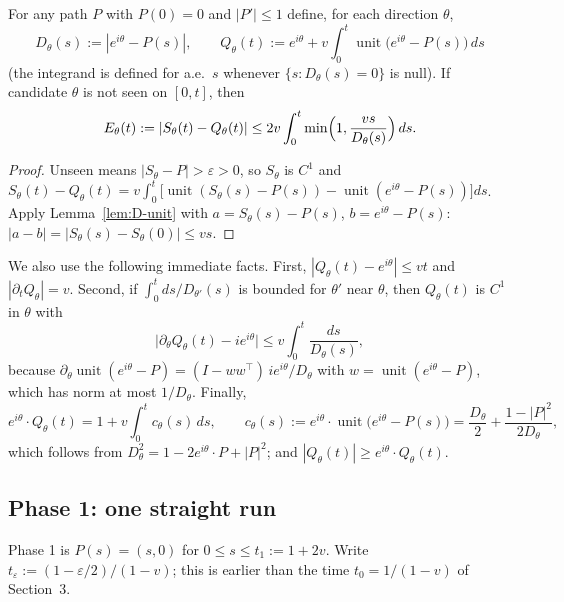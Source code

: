 \begin{lemma}\label{lem:D-pred}
For any path $P$ with $P(0)=0$ and $|P'|\le1$ define, for each direction $\theta$,
\begin{equation}\label{eq:D-Q}
D_\theta(s):=|e^{i\theta}-P(s)|,\qquad Q_\theta(t):=e^{i\theta}+v\int_0^t\operatorname{unit}\bigl(e^{i\theta}-P(s)\bigr)\,ds
\end{equation}
(the integrand is defined for a.e.\ $s$ whenever $\{s:D_\theta(s)=0\}$ is null). If candidate $\theta$ is not seen on $[0,t]$, then
\begin{equation}\label{eq:D-E}
E_\theta(t):=|S_\theta(t)-Q_\theta(t)|\le2v\int_0^t\min\Bigl(1,\frac{vs}{D_\theta(s)}\Bigr)\,ds .
\end{equation}
\end{lemma}
\begin{proof}
Unseen means $|S_\theta-P|>\varepsilon>0$, so $S_\theta$ is $C^1$ and
$S_\theta(t)-Q_\theta(t)=v\int_0^t\bigl[\operatorname{unit}(S_\theta(s)-P(s))-\operatorname{unit}(e^{i\theta}-P(s))\bigr]ds$.
Apply Lemma~\ref{lem:D-unit} with $a=S_\theta(s)-P(s)$, $b=e^{i\theta}-P(s)$: $|a-b|=|S_\theta(s)-S_\theta(0)|\le vs$.
\end{proof}

We also use the following immediate facts. First, $|Q_\theta(t)-e^{i\theta}|\le vt$ and $|\partial_tQ_\theta|=v$. Second, if
$\int_0^t ds/D_{\theta'}(s)$ is bounded for $\theta'$ near $\theta$, then $Q_\theta(t)$ is $C^1$ in $\theta$ with
\begin{equation}\label{eq:D-dQ}
\bigl|\partial_\theta Q_\theta(t)-ie^{i\theta}\bigr|\le v\int_0^t\frac{ds}{D_\theta(s)},
\end{equation}
because $\partial_\theta\operatorname{unit}(e^{i\theta}-P)=(I-ww^{\top})\,ie^{i\theta}/D_\theta$ with
$w=\operatorname{unit}(e^{i\theta}-P)$, which has norm at most $1/D_\theta$. Finally,
\begin{equation}\label{eq:D-ctheta}
e^{i\theta}\cdot Q_\theta(t)=1+v\int_0^tc_\theta(s)\,ds,\qquad
c_\theta(s):=e^{i\theta}\cdot\operatorname{unit}\bigl(e^{i\theta}-P(s)\bigr)=\frac{D_\theta}{2}+\frac{1-|P|^2}{2D_\theta},
\end{equation}
which follows from $D_\theta^2=1-2e^{i\theta}\cdot P+|P|^2$; and $|Q_\theta(t)|\ge e^{i\theta}\cdot Q_\theta(t)$.

\subsection{Phase 1: one straight run}\label{sec:D1-phase1}
Phase 1 is $P(s)=(s,0)$ for $0\le s\le t_1:=1+2v$. Write $t_\varepsilon:=(1-\varepsilon/2)/(1-v)$; this is earlier than the
time $t_0=1/(1-v)$ of Section~3.


